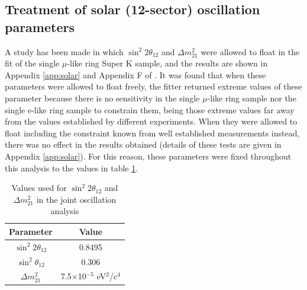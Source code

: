 \subsection* {Treatment of solar (12-sector) oscillation parameters}

A study has been made in which $\sin^{2}2\theta_{12}$ and $\Delta m_{21}^{2}$ were allowed to float in the fit of the single $\mu$-like ring Super K sample, and 
the results are shown in Appendix \ref{app:solar} and Appendix F of \cite{OurJointAnalysis}. It was found that when these parameters were allowed to float freely, the fitter returned extreme values of these parameter because there is no sensitivity in the single $\mu$-like ring sample nor the single e-like ring sample to constrain them, being those extreme values far away from the values established by different experiments. When they were allowed to float including the constraint known from well established measurements instead, there was no effect in the results obtained (details of these tests are given in Appendix \ref{app:solar}). 
For this reason, these parameters were fixed throughout this analysis to the values 
in table \ref{tab:solarparameters}.

\begin{table}[h]
\centering
\begin{tabular}{|c|c|}
\hline
Parameter & Value \\
\hline
\hline
$\sin^{2}2\theta_{12}$ & 0.8495 \\
\hline 
$\sin^{2}\theta_{12}$ & 0.306 \\
\hline 
$\Delta m_{21}^{2}$ & 7.5$\times$10$^{-5}$ eV$^{2}$/c$^{4}$ \\
\hline
\end{tabular}
\caption{Values used for $\sin^{2}2\theta_{12}$ and $\Delta m_{21}^{2}$ in the joint oscillation analysis}
\label{tab:solarparameters}
\end{table}
